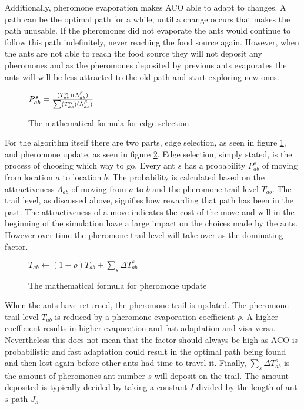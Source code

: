 Additionally, pheromone evaporation makes ACO able to adapt to changes. A path can be the optimal path for a while, until a change
occurs that makes the path unusable. If the pheromones did not evaporate the ants would continue to follow this path indefinitely,
never reaching the food source again. However, when the ants are not able to reach the food source they will not deposit any
pheromones and as the pheromones deposited by previous ants evaporates the ants will will be less attracted to the old path
and start exploring new ones.
 

\begin{figure}[h]
\centering
\begin{math}
P^s_{ab} = {(T^\alpha_{ab})(\Lambda^\beta_{ab}) \over \sum (T^\alpha_{ab})(\Lambda^\beta_{ab})}
\end{math}
\caption{The mathematical formula for edge selection}
\label{fig:edge}
\end{figure}

For the algorithm itself there are two parts, edge selection, as seen in figure \ref{fig:edge}, and pheromone update, as seen in figure \ref{fig:update}. 
Edge selection, simply stated, is the process of choosing which way to go. Every ant $s$ has a probability $P^s_{ab}$ of moving from location $a$ to location $b$. The probability
is calculated based on the attractiveness $\Lambda_{ab}$  of moving from $a$ to $b$ and the pheromone trail level $T_{ab}$. The trail level,
as discussed above, signifies how rewarding that path has been in the past. The attractiveness of a move indicates the cost of the move and 
will in the beginning of the simulation have a large impact on the choices made by the ants. However over time the pheromone trail level will take over as the
dominating factor.

\begin{figure}[h]
\centering
\begin{math}
T_{ab} \leftarrow (1 - \rho)T_{ab} + \sum \limits_{s} \Delta T^s_{ab}
\end{math}
\caption{The mathematical formula for pheromone update}
\label{fig:update}
\end{figure}

When the ants have returned, the pheromone trail is updated. The pheromone trail level $T_{ab}$ is reduced by a pheromone evaporation
coefficient $\rho$. A higher coefficient results in higher evaporation and fast adaptation and visa versa. Nevertheless this does not mean
that the factor should always be high as ACO is probabilistic and fast adaptation could result in the optimal path being found and then lost
again before other ants had time to travel it. Finally, $\sum \limits_{s} \Delta T^s_{ab}$ is the amount of pheromones ant number $s$ will deposit on
the trail. The amount deposited is typically decided by taking a constant $I$ divided by the length of ant $s$ path $J_s$

